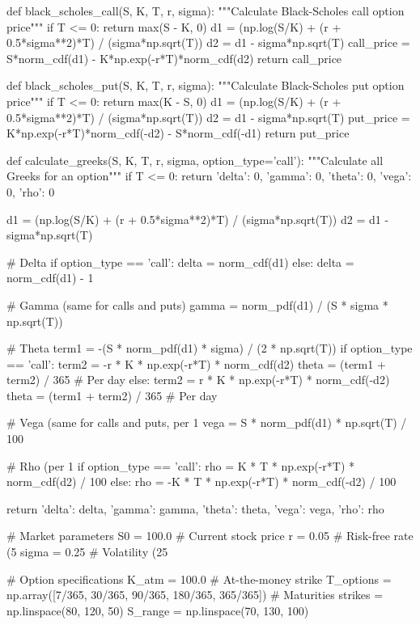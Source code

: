 \documentclass[a4paper, 11pt]{article}
\begin{document}
\begin{pycode}
def black_scholes_call(S, K, T, r, sigma):
    """Calculate Black-Scholes call option price"""
    if T <= 0:
        return max(S - K, 0)
    d1 = (np.log(S/K) + (r + 0.5*sigma**2)*T) / (sigma*np.sqrt(T))
    d2 = d1 - sigma*np.sqrt(T)
    call_price = S*norm_cdf(d1) - K*np.exp(-r*T)*norm_cdf(d2)
    return call_price

def black_scholes_put(S, K, T, r, sigma):
    """Calculate Black-Scholes put option price"""
    if T <= 0:
        return max(K - S, 0)
    d1 = (np.log(S/K) + (r + 0.5*sigma**2)*T) / (sigma*np.sqrt(T))
    d2 = d1 - sigma*np.sqrt(T)
    put_price = K*np.exp(-r*T)*norm_cdf(-d2) - S*norm_cdf(-d1)
    return put_price

def calculate_greeks(S, K, T, r, sigma, option_type='call'):
    """Calculate all Greeks for an option"""
    if T <= 0:
        return {'delta': 0, 'gamma': 0, 'theta': 0, 'vega': 0, 'rho': 0}

    d1 = (np.log(S/K) + (r + 0.5*sigma**2)*T) / (sigma*np.sqrt(T))
    d2 = d1 - sigma*np.sqrt(T)

    # Delta
    if option_type == 'call':
        delta = norm_cdf(d1)
    else:
        delta = norm_cdf(d1) - 1

    # Gamma (same for calls and puts)
    gamma = norm_pdf(d1) / (S * sigma * np.sqrt(T))

    # Theta
    term1 = -(S * norm_pdf(d1) * sigma) / (2 * np.sqrt(T))
    if option_type == 'call':
        term2 = -r * K * np.exp(-r*T) * norm_cdf(d2)
        theta = (term1 + term2) / 365  # Per day
    else:
        term2 = r * K * np.exp(-r*T) * norm_cdf(-d2)
        theta = (term1 + term2) / 365  # Per day

    # Vega (same for calls and puts, per 1%
    vega = S * norm_pdf(d1) * np.sqrt(T) / 100

    # Rho (per 1%
    if option_type == 'call':
        rho = K * T * np.exp(-r*T) * norm_cdf(d2) / 100
    else:
        rho = -K * T * np.exp(-r*T) * norm_cdf(-d2) / 100

    return {'delta': delta, 'gamma': gamma, 'theta': theta, 'vega': vega, 'rho': rho}

# Market parameters
S0 = 100.0          # Current stock price
r = 0.05            # Risk-free rate (5%
sigma = 0.25        # Volatility (25%

# Option specifications
K_atm = 100.0       # At-the-money strike
T_options = np.array([7/365, 30/365, 90/365, 180/365, 365/365])  # Maturities
strikes = np.linspace(80, 120, 50)
S_range = np.linspace(70, 130, 100)


\end{pycode}
\end{document}
